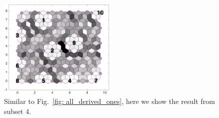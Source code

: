 \begin{figure}
        \centering
         \includegraphics[width=0.5\textwidth]{../../images0.01/M31/2D/image_subsets/subset2_dist_with_hits_t.png}
    \caption{Similar to Fig.~\ref{fig: all_derived_ones}, here we show the result from subset 4.}
    \label{fig: subset2}
\end{figure}